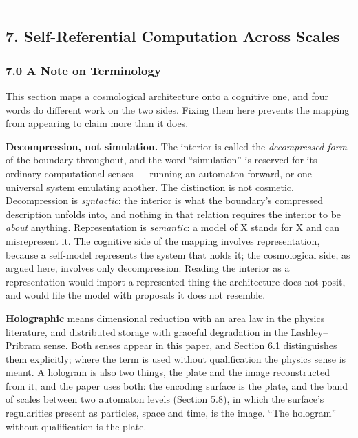 \documentclass[
]{article}
\begin{document}
\begin{center}\rule{0.5\linewidth}{0.5pt}\end{center}

\hypertarget{self-referential-computation-across-scales}{%
\subsection{7. Self-Referential Computation Across
Scales}\label{self-referential-computation-across-scales}}

\hypertarget{a-note-on-terminology}{%
\subsubsection{7.0 A Note on Terminology}\label{a-note-on-terminology}}

This section maps a cosmological architecture onto a cognitive one, and
four words do different work on the two sides. Fixing them here prevents
the mapping from appearing to claim more than it does.

\textbf{Decompression, not simulation.} The interior is called the
\emph{decompressed form} of the boundary throughout, and the word
``simulation'' is reserved for its ordinary computational senses ---
running an automaton forward, or one universal system emulating another.
The distinction is not cosmetic. Decompression is \emph{syntactic}: the
interior is what the boundary's compressed description unfolds into, and
nothing in that relation requires the interior to be \emph{about}
anything. Representation is \emph{semantic}: a model of X stands for X
and can misrepresent it. The cognitive side of the mapping involves
representation, because a self-model represents the system that holds
it; the cosmological side, as argued here, involves only decompression.
Reading the interior as a representation would import a
represented-thing the architecture does not posit, and would file the
model with proposals it does not resemble.

\textbf{Holographic} means dimensional reduction with an area law in the
physics literature, and distributed storage with graceful degradation in
the Lashley--Pribram sense. Both senses appear in this paper, and
Section 6.1 distinguishes them explicitly; where the term is used
without qualification the physics sense is meant. A hologram is also two
things, the plate and the image reconstructed from it, and the paper
uses both: the encoding surface is the plate, and the band of scales
between two automaton levels (Section 5.8), in which the surface's
regularities present as particles, space and time, is the image. ``The
hologram'' without qualification is the plate.
\end{document}
